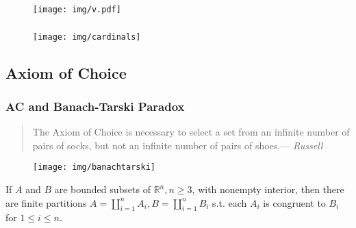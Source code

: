 \documentclass[UTF8,11pt,colorlinks,compress,openany]{beamer}%
\begin{document}
\begin{frame}\frametitle{}
	\begin{figure}
		\texttt{[image: img/v.pdf]}
	\end{figure}
\end{frame}

\begin{frame}\frametitle{}
	\begin{figure}
		\texttt{[image: img/cardinals]}
	\end{figure}
\end{frame}

\subsection{Axiom of Choice}

\begin{frame}\frametitle{AC and Banach-Tarski Paradox}
	\begin{quote}
		The Axiom of Choice is necessary to select a set from an infinite number of pairs of socks, but not an infinite number of pairs of shoes.\hfill --- \textsl{Russell}
	\end{quote}
	\begin{figure}
		\texttt{[image: img/banachtarski]}
	\end{figure}
	\begin{theorem}
		If $A$ and $B$ are bounded subsets of $\mathbb{R}^n, n\geq 3$, with nonempty interior, then there are finite partitions $A=\coprod\limits_{i=1}^n A_i, B=\coprod\limits_{i=1}^n B_i$ s.t. each $A_i$ is congruent to $B_i$ for $1\leq i\leq n$.
	\end{theorem}
\end{frame}
\end{document}
